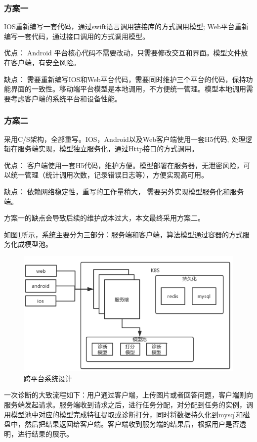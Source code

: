 \subsubsection{方案一}
 IOS重新编写一套代码，通过swift语言调用链接库的方式调用模型; Web平台重新编写一套代码，通过接口调用的方式调用模型。

优点： Android 平台核心代码不需要改动，只需要修改交互和界面。模型文件放在客户端，有安全风险。

缺点： 需要重新编写IOS和Web平台代码，需要同时维护三个平台的代码，保持功能界面的一致性。移动端平台模型是本地调用，不方便统一管理。模型本地调用需要考虑客户端的系统平台和设备性能。

\subsubsection{方案二}
采用C/S架构，全部重写。IOS，Android以及Web客户端使用一套H5代码, 处理逻辑在服务端实现，模型独立服务化，通过Http接口的方式调用。

优点： 客户端使用一套H5代码，维护方便。模型部署在服务器，无泄密风险，可以统一管理（统计调用次数，记录错误日志等），方便实现高可用。

缺点： 依赖网络稳定性，重写的工作量稍大， 需要另外实现模型服务化和服务端。

方案一的缺点会导致后续的维护成本过大，本文最终采用方案二。

如图\ref{fig:system}所示，系统主要分为三部分：服务端和客户端，算法模型通过容器的方式服务化成模型池。

\begin{figure}[ht]
    \centering
    \includegraphics[width=12cm]{images/system.png}
    \caption{跨平台系统设计}
    \label{fig:system}
\end{figure}

一次诊断的大致流程如下：用户通过客户端，上传图片或者回答问题，客户端则向服务端发起请求。服务端收到请求之后，进行任务分配，对分配到任务的实例，调用模型池中对应的模型完成特征提取或诊断打分，同时将数据持久化到mysql和磁盘中，然后把结果返回给客户端。客户端收到服务端的结果后，根据用户是否透明，进行结果的展示。

